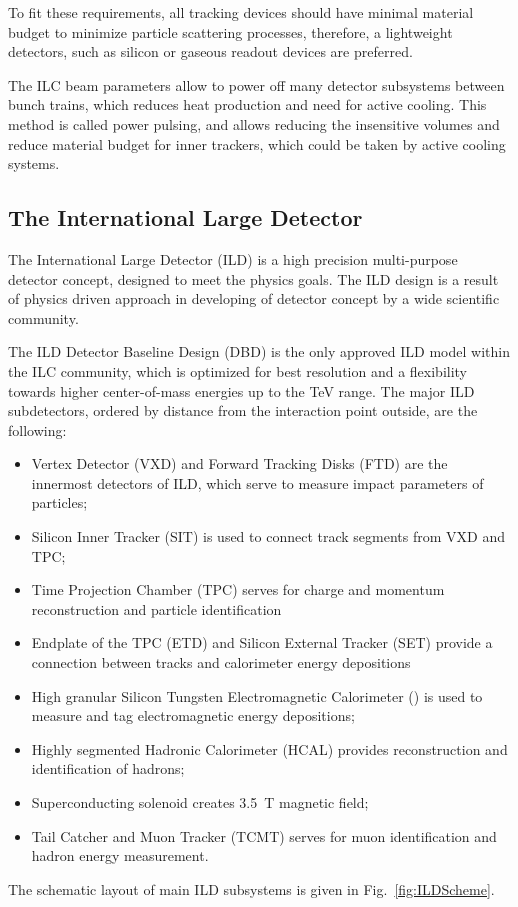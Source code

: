 To fit these requirements, all tracking devices should have minimal material budget to minimize particle scattering processes, therefore, a lightweight detectors, such as silicon or gaseous readout devices are preferred.

The ILC beam parameters allow to power off many detector subsystems between bunch trains, which reduces heat production and need for active cooling. This method is called power pulsing, and allows reducing the insensitive volumes and reduce material budget for inner trackers, which could be taken by active cooling systems. 


\subsection{The International Large Detector}


The International Large Detector (ILD) is a high precision multi-purpose detector concept, designed to meet the physics goals.
The ILD design is a result of physics driven approach in developing of detector concept by a wide scientific community. 

The ILD Detector Baseline Design (DBD) is the only approved ILD model within the ILC community, which is optimized for best resolution and a flexibility towards higher center-of-mass energies
up to the TeV range.
The major ILD subdetectors, ordered by distance from the interaction point outside, are the following:
\begin{itemize}
\item Vertex Detector (VXD) and Forward Tracking Disks (FTD) are the innermost detectors of ILD, which serve to measure impact parameters of particles;
\item Silicon Inner Tracker (SIT) is used to connect track segments from VXD and TPC;
\item Time Projection Chamber (TPC) serves for charge and momentum reconstruction and particle identification
\item Endplate of the TPC (ETD) and Silicon External Tracker (SET) provide a connection between tracks and calorimeter energy depositions 
\item High granular Silicon Tungsten Electromagnetic Calorimeter (\ecal) is used to measure and tag electromagnetic energy depositions;
\item Highly segmented Hadronic Calorimeter (HCAL) provides reconstruction and identification of hadrons;
\item Superconducting solenoid creates 3.5~T magnetic field;
\item Tail Catcher and Muon Tracker (TCMT) serves for muon identification and hadron energy measurement.
\end{itemize}
The schematic layout of main ILD subsystems is given in Fig.~\ref{fig:ILDScheme}.


